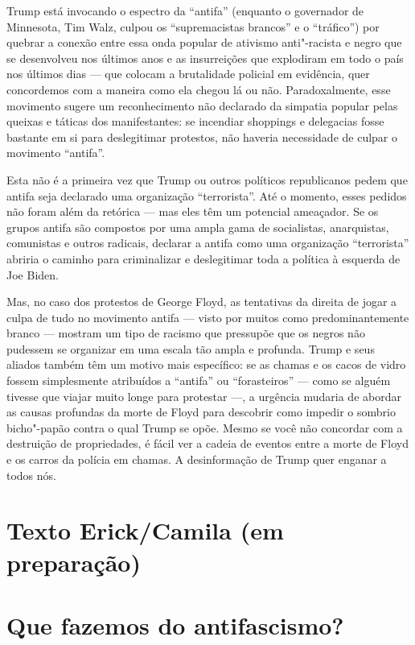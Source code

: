 Trump está invocando o espectro da ``antifa'' (enquanto o governador de Minnesota, Tim Walz, culpou os ``supremacistas brancos'' e o ``tráfico'') por quebrar a conexão entre essa onda popular de ativismo anti"-racista e negro que se desenvolveu nos últimos anos e as insurreições que explodiram em todo o país nos últimos dias — que colocam a brutalidade policial em evidência, quer concordemos com a maneira como ela chegou lá ou não. Paradoxalmente, esse movimento sugere um reconhecimento não declarado da simpatia popular pelas queixas e táticas dos manifestantes: se incendiar shoppings e delegacias fosse bastante em si para deslegitimar protestos, não haveria necessidade de culpar o movimento ``antifa''.
 
Esta não é a primeira vez que Trump ou outros políticos republicanos pedem que antifa seja declarado uma organização ``terrorista''. Até o momento, esses pedidos não foram além da retórica — mas eles têm um potencial ameaçador. Se os grupos antifa são compostos por uma ampla gama de socialistas, anarquistas, comunistas e outros radicais, declarar a antifa como uma organização ``terrorista'' abriria o caminho para criminalizar e deslegitimar toda a política à esquerda de Joe Biden.
 
Mas, no caso dos protestos de George Floyd, as tentativas da direita de jogar a culpa de tudo no movimento antifa — visto por muitos como predominantemente branco — mostram um tipo de racismo que pressupõe que os negros não pudessem se organizar em uma escala tão ampla e profunda. Trump e seus aliados também têm um motivo mais específico: se as chamas e os cacos de vidro fossem simplesmente atribuídos a ``antifa'' ou ``forasteiros'' — como se alguém tivesse que viajar muito longe para protestar —, a urgência mudaria de abordar as causas profundas da morte de Floyd para descobrir como impedir o sombrio bicho"-papão contra o qual Trump se opõe. Mesmo se você não concordar com a destruição de propriedades, é fácil ver a cadeia de eventos entre a morte de Floyd e os carros da polícia em chamas. A desinformação de Trump quer enganar a todos nós.



\chapter{Texto Erick/Camila (em preparação)}

\lipsum[5]

\chapter{Que fazemos do antifascismo?}

